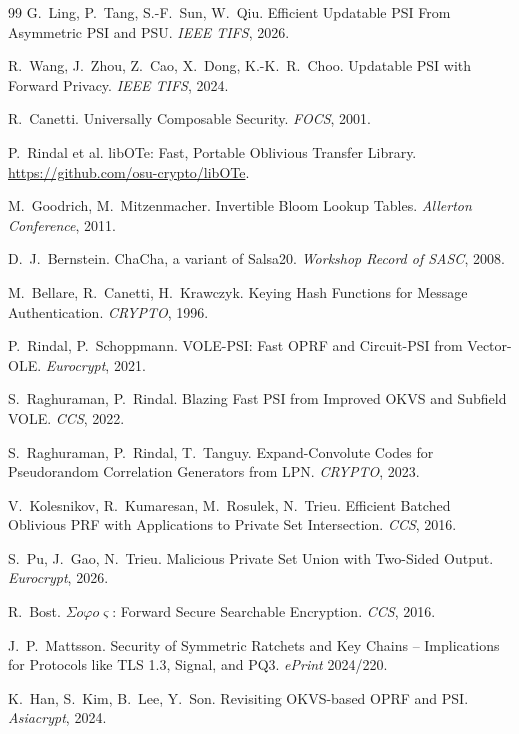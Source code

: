 \documentclass[letterpaper,twocolumn,10pt]{article}
\theoremstyle{definition}
\begin{document}
\begin{thebibliography}{99}
 G.~Ling, P.~Tang, S.-F.~Sun, W.~Qiu.
\newblock Efficient Updatable PSI From Asymmetric PSI and PSU. \emph{IEEE TIFS}, 2026.

 R.~Wang, J.~Zhou, Z.~Cao, X.~Dong, K.-K.~R.~Choo.
\newblock Updatable PSI with Forward Privacy. \emph{IEEE TIFS}, 2024.

 R.~Canetti.
\newblock Universally Composable Security. \emph{FOCS}, 2001.

 P.~Rindal et al.
\newblock libOTe: Fast, Portable Oblivious Transfer Library. \url{https://github.com/osu-crypto/libOTe}.

 M.~Goodrich, M.~Mitzenmacher.
\newblock Invertible Bloom Lookup Tables. \emph{Allerton Conference}, 2011.

 D.~J.~Bernstein.
\newblock ChaCha, a variant of Salsa20. \emph{Workshop Record of SASC}, 2008.

 M.~Bellare, R.~Canetti, H.~Krawczyk.
\newblock Keying Hash Functions for Message Authentication. \emph{CRYPTO}, 1996.

 P.~Rindal, P.~Schoppmann.
\newblock VOLE-PSI: Fast OPRF and Circuit-PSI from Vector-OLE. \emph{Eurocrypt}, 2021.

 S.~Raghuraman, P.~Rindal.
\newblock Blazing Fast PSI from Improved OKVS and Subfield VOLE. \emph{CCS}, 2022.

 S.~Raghuraman, P.~Rindal, T.~Tanguy.
\newblock Expand-Convolute Codes for Pseudorandom Correlation Generators from LPN. \emph{CRYPTO}, 2023.

 V.~Kolesnikov, R.~Kumaresan, M.~Rosulek, N.~Trieu.
\newblock Efficient Batched Oblivious PRF with Applications to Private Set Intersection. \emph{CCS}, 2016.

 S.~Pu, J.~Gao, N.~Trieu.
\newblock Malicious Private Set Union with Two-Sided Output. \emph{Eurocrypt}, 2026.

 R.~Bost.
\newblock $\Sigma o\varphi o\varsigma$: Forward Secure Searchable Encryption. \emph{CCS}, 2016.

 J.~P.~Mattsson.
\newblock Security of Symmetric Ratchets and Key Chains -- Implications for Protocols like TLS 1.3, Signal, and PQ3. \emph{ePrint} 2024/220.

 K.~Han, S.~Kim, B.~Lee, Y.~Son.
\newblock Revisiting OKVS-based OPRF and PSI. \emph{Asiacrypt}, 2024.


\end{thebibliography}
\end{document}
